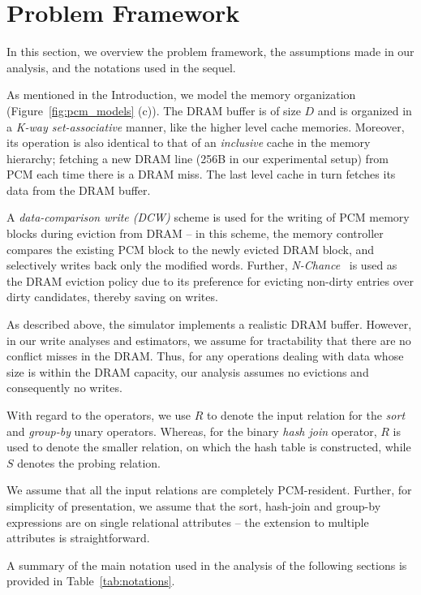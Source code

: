 \section{Problem Framework}
\label{assumptions}
In this section, we overview the problem framework, the assumptions made
in our analysis, and the notations used in the sequel.

As mentioned in the Introduction, we model the \model{} memory
organization (Figure~\ref{fig:pcm_models} (c)). The DRAM buffer is of
size $D$ and is organized in a \emph{K-way set-associative} manner, like the higher level cache memories. Moreover, its operation is also identical to that of an \emph{inclusive} cache in the memory hierarchy; fetching a new DRAM line (256B in our experimental setup) from PCM each time there is a DRAM miss. The last level cache in turn fetches its data from the DRAM buffer.

A \textit{data-comparison write (DCW)} scheme \cite{write} is used for
the writing of PCM memory blocks during eviction from DRAM -- in this
scheme, the memory controller compares the existing PCM block to the newly
evicted DRAM block, and selectively writes back only the modified words.
Further, \textit{N-Chance}~\cite{nchance} is used as the DRAM eviction
policy due to its preference
for evicting non-dirty entries over dirty candidates, thereby saving
on writes.

As described above, the simulator implements a realistic DRAM
buffer. However, in our write analyses and estimators, we assume for
tractability that there are no conflict misses in the DRAM. Thus, for
any operations dealing with data whose size is within the DRAM capacity,
our analysis assumes no evictions and consequently no writes.

With regard to the operators, we use $R$ to denote the input relation
for the \textit{sort} and \textit{group-by} unary operators.  Whereas,
for the binary \textit{hash join} operator, $R$ is used to denote the
smaller relation, on which the hash table is constructed, while $S$
denotes the probing relation. 

We assume that all the input relations are completely PCM-resident.
Further, for simplicity of presentation, we assume that the sort,
hash-join and group-by expressions are on single relational attributes --
the extension to multiple attributes is straightforward.

A summary of the main notation used in the analysis of the following
sections is provided in Table~\ref{tab:notations}.

